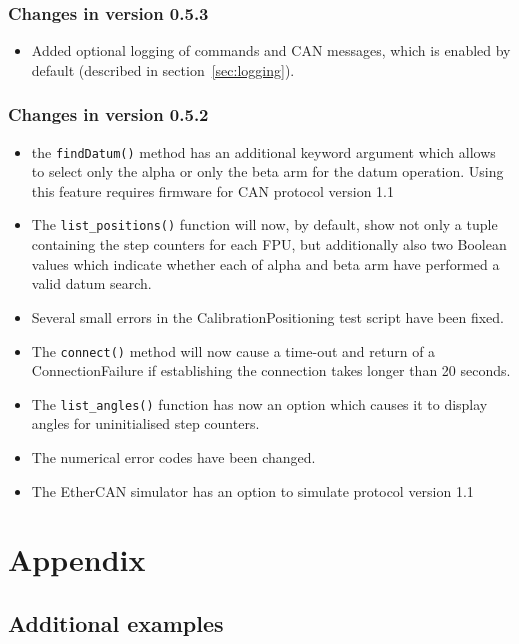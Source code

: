 \documentclass[fontsize=12,a4paper]{scrreprt}
\begin{document}
\section*{Changes in version 0.5.3}
\begin{itemize}
\item Added optional logging of commands and CAN messages, which
  is enabled by default (described in section~\ref{sec:logging}).
\end{itemize}

\section*{Changes in version 0.5.2}
\begin{itemize}
\item the \texttt{findDatum()} method has an additional keyword
  argument which allows to select only the alpha or only the beta arm
  for the datum operation. Using this feature requires firmware for
  CAN protocol version 1.1
\item The \texttt{list\_positions()} function will now, by default,
  show not only a tuple containing the step counters for each FPU, but
  additionally also two Boolean values which indicate whether each of
  alpha and beta arm have performed a valid datum search.
\item Several small errors in the CalibrationPositioning test script
  have been fixed.
\item The \texttt{connect()} method will now cause a time-out and
  return of a ConnectionFailure if establishing the connection takes
  longer than 20 seconds.
\item The \texttt{list\_angles()} function has now an option which
  causes it to display angles for uninitialised step counters.
\item The numerical error codes have been changed.
\item The EtherCAN simulator has an option to simulate protocol version 1.1
\end{itemize}

\part{Appendix}
\appendix

\chapter{Additional examples}
\label{sec:moreexamples}
\end{document}
